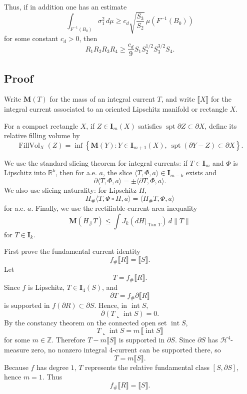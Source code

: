 \documentclass[12pt]{article}
\begin{document}
Thus, if in addition one has an estimate
\[
\int_{F^{-1}(B_0)}\sigma_1^2\,d\mu
\ge
c_d\sqrt{\frac{S_3}{S_2}}\,
\mu(F^{-1}(B_0))
\]
for some constant \(c_d>0\), then
\[
R_1R_2R_3R_4
\ge
\frac{c_d}{9}S_1S_2^{1/2}S_3^{3/2}S_4.
\]

\subsection*{Proof}

Write \(\mathbf M(T)\) for the mass of an integral current \(T\), and write \(\llbracket X\rrbracket\) for the integral current associated to an oriented Lipschitz manifold or rectangle \(X\).

For a compact rectangle \(X\), if \(Z\in \mathbf I_m(X)\) satisfies \(\operatorname{spt}\partial Z\subset \partial X\), define its relative filling volume by
\[
\operatorname{FillVol}_X(Z)
=
\inf\left\{
\mathbf M(Y):
Y\in \mathbf I_{m+1}(X),\
\operatorname{spt}(\partial Y-Z)\subset \partial X
\right\}.
\]

We use the standard slicing theorem for integral currents: if \(T\in \mathbf I_m\) and \(\Phi\) is Lipschitz into \(\mathbb R^k\), then for a.e. \(a\), the slice \(\langle T,\Phi,a\rangle\in \mathbf I_{m-k}\) exists and
\[
\partial\langle T,\Phi,a\rangle
=
\pm \langle \partial T,\Phi,a\rangle.
\]
We also use slicing naturality: for Lipschitz \(H\),
\[
H_\#\langle T,\Phi\circ H,a\rangle
=
\langle H_\#T,\Phi,a\rangle
\]
for a.e. \(a\). Finally, we use the rectifiable-current area inequality
\[
\mathbf M(H_\#T)
\le
\int J_k(dH|_{\operatorname{Tan}T})\,d\|T\|
\]
for \(T\in\mathbf I_k\).

First prove the fundamental current identity
\[
f_\#\llbracket R\rrbracket=\llbracket S\rrbracket .
\] 
Let
\[
T=f_\#\llbracket R\rrbracket.
\]
Since \(f\) is Lipschitz, \(T\in\mathbf I_4(S)\), and
\[
\partial T=f_\#\partial\llbracket R\rrbracket
\]
is supported in \(f(\partial R)\subset \partial S\). Hence, in \(\operatorname{int}S\),
\[
\partial(T\llcorner \operatorname{int}S)=0.
\]
By the constancy theorem on the connected open set \(\operatorname{int}S\),
\[
T\llcorner \operatorname{int}S
=
m\,\llbracket \operatorname{int}S\rrbracket
\]
for some \(m\in\mathbb Z\). Therefore \(T-m\llbracket S\rrbracket\) is supported in \(\partial S\). Since \(\partial S\) has \(\mathcal H^4\)-measure zero, no nonzero integral \(4\)-current can be supported there, so
\[
T=m\llbracket S\rrbracket.
\]
Because \(f\) has degree \(1\), \(T\) represents the relative fundamental class \([S,\partial S]\), hence \(m=1\). Thus
\[
f_\#\llbracket R\rrbracket=\llbracket S\rrbracket .
\]
\end{document}
